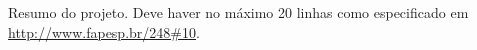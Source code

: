 
Resumo do projeto. Deve haver no máximo 20 linhas como especificado em \url{http://www.fapesp.br/248#10}.